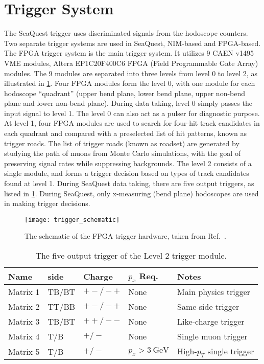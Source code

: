 \documentclass[../main.tex]{subfiles}
\begin{document}
\section{Trigger System}
The SeaQuest trigger uses discriminated signals from the hodoscope counters.
Two separate trigger systems are used in SeaQuest, NIM-based and FPGA-based.
The FPGA trigger system is the main trigger system. It utilizes 9 CAEN
v1495 VME modules, Altera EP1C20F400C6 FPGA (Field Programmable Gate Array)
modules. The 9 modules are separated into three levels from level 0 to level
2, as illustrated in \cref{fig:trigger}.
Four FPGA modules form the level 0, with one module for each hodoscope
``quadrant'' (upper bend plane, lower bend plane, upper non-bend plane and
lower non-bend plane). During data taking, level 0 simply passes the input signal
to level 1. The level 0 can also act as a pulser for diagnostic purpose.
At level 1, four FPGA modules are used to search for four-hit track
candidates in each quadrant and compared with a preselected list of hit
patterns, known as trigger roads. The list of trigger roads (known as roadset)
are generated by studying the path of muons from Monte Carlo simulations, with
the goal of preserving signal rates while suppressing backgrounds.
The level 2 consists of a single module, and forms
a trigger decision based on types of track candidates found at level 1. During
SeaQuest data taking, there are five output triggers, as listed in \cref{tab:FPGA}.
During SeaQuest, only x-measuring (bend plane) hodoscopes are used in making
trigger decisions.
\begin{figure}
	\centering
	\texttt{[image: trigger\_schematic]}
	\caption{The schematic of the FPGA trigger hardware, taken from Ref.~\cite{aidala2019}.}
	\label{fig:trigger}
\end{figure}
\begin{table}[h!]
	\centering
	\caption{The five output trigger of the Level 2 trigger module.}
	\label{tab:FPGA}
	\begin{tabular}{lllll}
		Name     & side  & Charge  & $p_x$ Req.         & Notes                     \\ \hline
		Matrix 1 & TB/BT & $+-/-+$ & None               & Main physics trigger      \\
		Matrix 2 & TT/BB & $+-/-+$ & None               & Same-side trigger         \\
		Matrix 3 & TB/BT & $++/--$ & None               & Like-charge trigger       \\
		Matrix 4 & T/B   & $+/-$   & None               & Single muon trigger       \\
		Matrix 5 & T/B   & $+/-$   & $p_x>\SI{3}{\GeV}$ & High-$p_T$ single trigger \\ \hline
	\end{tabular}
\end{table}
\end{document}
